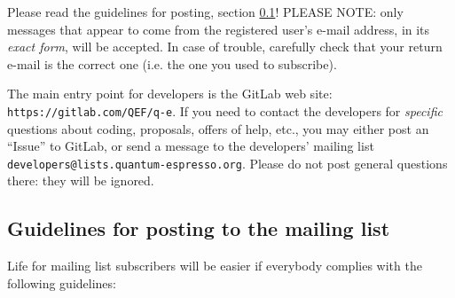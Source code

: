 \documentclass[12pt,a4paper]{article}
\begin{document}
Please read the guidelines for posting, section \ref{SubSec:Guidelines}!
PLEASE NOTE: only messages that appear to come from the
registered user's e-mail address, in its {\em exact form}, will be
accepted. In case of trouble, carefully check that your return
e-mail is the correct one (i.e. the one you used to subscribe).


The main entry point for developers is the GitLab web site:
\texttt{https://gitlab.com/QEF/q-e}.
If you need to contact the developers for {\em specific} questions
about coding, proposals, offers of help, etc., you may either post
an ``Issue'' to GitLab, or send a message
to the developers' mailing list \texttt{developers@lists.quantum-espresso.org}.
Please do not post general questions there: they will be ignored.

\subsection{Guidelines for posting to the mailing list}
\label{SubSec:Guidelines}
Life for mailing list subscribers will be easier if everybody
complies with the following guidelines:
\end{document}
